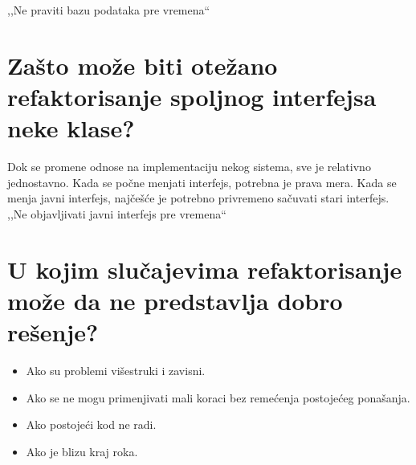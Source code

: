 \documentclass[a4paper]{article}
\begin{document}
  ,,Ne praviti bazu podataka pre vremena``

\section{Zašto može biti otežano refaktorisanje spoljnog interfejsa neke klase?}
  Dok se promene odnose na implementaciju nekog sistema, sve je relativno jednostavno. Kada se
  počne menjati interfejs, potrebna je prava mera. Kada se menja javni interfejs, najčešće je
  potrebno privremeno sačuvati stari interfejs.\\

  ,,Ne objavljivati javni interfejs pre vremena``

\section{U kojim slučajevima refaktorisanje može da ne predstavlja dobro rešenje?}
  \begin{itemize}
    \item Ako su problemi višestruki i zavisni.
    \item Ako se ne mogu primenjivati mali koraci bez remećenja postojećeg ponašanja.
    \item Ako postojeći kod ne radi.
    \item Ako je blizu kraj roka.
  \end{itemize}
\end{document}
